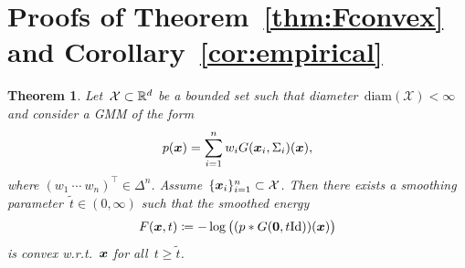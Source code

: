 \documentclass{article}
\newcommand{\X}{\mathcal{X}}
\newcommand{\id}{\mathrm{Id}}
\renewcommand{\vec}[1]{\mathbf{#1}}
\newcommand{\diameter}{\mathrm{diam}}
\theoremstyle{plain}
\newtheorem{theorem}{Theorem}[section]
\theoremstyle{definition}
\theoremstyle{remark}
\begin{document}




\newpage
\appendix
\onecolumn

\section{Proofs of Theorem~\ref{thm:Fconvex} and Corollary~\ref{cor:empirical}} \label{apdx:proofs}

\begin{theorem}
Let~$\X\subset\R^d$ be a bounded set such that diameter~$\diameter(\X)<\infty$ and consider a GMM of the form
\[
p({\bm{x}}) = \sum_{i=1}^n w_i G({\bm{x}}_i,\Sigma_i)({\bm{x}}),
\]
where $(w_1\ \cdots \ w_n)^\top\in\Delta^n$. Assume~$\{\vx_i\}_{i=1}^n\subset\X$.
Then there exists a smoothing parameter~$\widetilde{t}\in(0,\infty)$ such that the smoothed energy
\[
F(\vx,t)\coloneqq -\log \big( (p \ast G(\vec{0}, t\id))(\vx)\big)
\]
is \emph{convex} w.r.t.~${\bm{x}}$ for all~$t\geq\widetilde{t}$.
\end{theorem}
\end{document}

